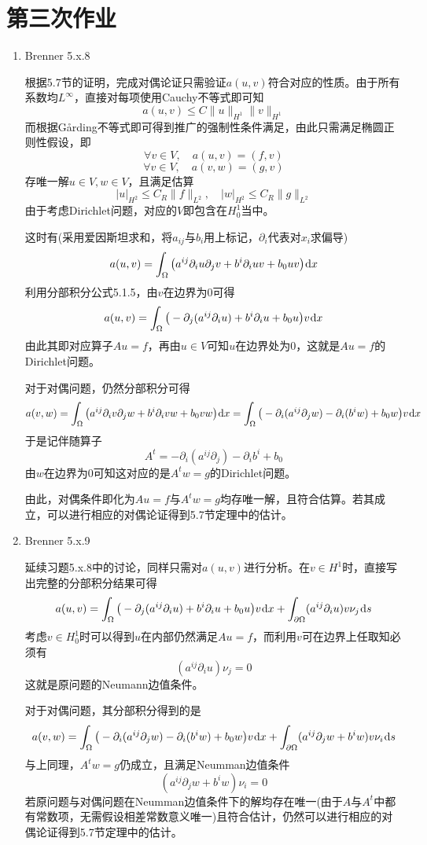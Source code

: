 \documentclass[a4paper,UTF8,fontset=windows,10pt]{ctexart}
\newcommand*{\dr}{\hspace{0.07em}\mathrm{d}}
\begin{document}
\section{第三次作业}
\begin{enumerate}
    \item Brenner 5.x.8
    
    根据5.7节的证明，完成对偶论证只需验证$a(u,v)$符合对应的性质。由于所有系数均$L^\infty$，直接对每项使用Cauchy不等式即可知
    $$a(u,v)\le C\|u\|_{H^1}\|v\|_{H^1}$$
    而根据G\r{a}rding不等式即可得到推广的强制性条件满足，由此只需满足椭圆正则性假设，即
    $$\forall v\in V,\quad a(u,v)=(f,v)$$
    $$\forall v\in V,\quad a(v,w)=(g,v)$$
    存唯一解$u\in V,w\in V$，且满足估算
    $$|u|_{H^2}\le C_R\|f\|_{L^2},\quad|w|_{H^2}\le C_R\|g\|_{L^2}$$
    由于考虑Dirichlet问题，对应的$V$即包含在$H_0^1$当中。
    
    这时有(采用爱因斯坦求和，将$a_{ij}$与$b_i$用上标记，$\partial_i$代表对$x_i$求偏导)
    $$a(u,v)=\int_\Omega\big(a^{ij}\partial_iu\partial_jv+b^i\partial_iuv+b_0uv\big)\dr x$$
    利用分部积分公式5.1.5，由$v$在边界为0可得
    $$a(u,v)=\int_\Omega\big(-\partial_j(a^{ij}\partial_iu)+b^i\partial_iu+b_0u\big)v\dr x$$
    由此其即对应算子$Au=f$，再由$u\in V$可知$u$在边界处为0，这就是$Au=f$的Dirichlet问题。
    
    对于对偶问题，仍然分部积分可得
    $$a(v,w)=\int_\Omega\big(a^{ij}\partial_iv\partial_jw+b^i\partial_ivw+b_0vw\big)\dr x=\int_\Omega\big(-\partial_i(a^{ij}\partial_jw)-\partial_i(b^iw)+b_0w\big)v\dr x$$
    于是记伴随算子
    $$A^t=-\partial_i(a^{ij}\partial_j)-\partial_ib^i+b_0$$
    由$w$在边界为0可知这对应的是$A^tw=g$的Dirichlet问题。
    
    由此，对偶条件即化为$Au=f$与$A^tw=g$均存唯一解，且符合估算。若其成立，可以进行相应的对偶论证得到5.7节定理中的估计。
    
    \item Brenner 5.x.9
    
    延续习题5.x.8中的讨论，同样只需对$a(u,v)$进行分析。在$v\in H^1$时，直接写出完整的分部积分结果可得
    $$a(u,v)=\int_\Omega\big(-\partial_j(a^{ij}\partial_iu)+b^i\partial_iu+b_0u\big)v\dr x+\int_{\partial\Omega}(a^{ij}\partial_iu)v\nu_j\dr s$$
    考虑$v\in H_0^1$时可以得到$u$在内部仍然满足$Au=f$，而利用$v$可在边界上任取知必须有
    $$(a^{ij}\partial_iu)\nu_j=0$$
    这就是原问题的Neumann边值条件。
    
    对于对偶问题，其分部积分得到的是
    $$a(v,w)=\int_\Omega\big(-\partial_i(a^{ij}\partial_jw)-\partial_i(b^iw)+b_0w\big)v\dr x+\int_{\partial\Omega}(a^{ij}\partial_jw+b^iw)v\nu_i\dr s$$
    与上同理，$A^tw=g$仍成立，且满足Neumman边值条件
    $$(a^{ij}\partial_j w+b^iw)\nu_i=0$$
    若原问题与对偶问题在Neumman边值条件下的解均存在唯一(由于$A$与$A^t$中都有常数项，无需假设相差常数意义唯一)且符合估计，仍然可以进行相应的对偶论证得到5.7节定理中的估计。
    

\end{enumerate}
\end{document}
